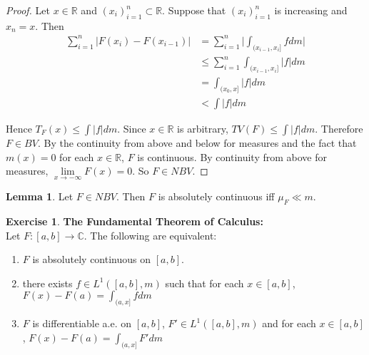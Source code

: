 \documentclass[12pt]{amsart}
\theoremstyle{definition}
\newtheorem{lem}[definition]{Lemma}
\newtheorem{ex}[definition]{Exercise}
\newcommand{\C}{\mathbb{C}}
\newcommand{\R}{\mathbb{R}}
\newcommand{\lex}[1]{\label{ex:#1}}
\begin{document}
	\begin{proof}
		Let $x \in \R$ and $(x_i)_{i=1}^n \subset \R$. Suppose that $(x_i)_{i=1}^n$ is increasing and $x_n=x$. Then 
		\begin{align*}
			\sum_{i=1}^n|F(x_i)-F(x_{i-1})| 
			&= \sum_{i=1}^n \bigg| \int_{(x_{i-1},x_i]}fdm \bigg|\\
			& \leq \sum_{i=1}^n \int_{(x_{i-1},x_i]}|f|dm \\
			& = \int_{(x_0,x]}|f|dm\\
			& < \int|f|dm
		\end{align*}
		
		Hence $T_F(x) \leq \int |f|dm$. Since $x \in \R$ is arbitrary, $TV(F) \leq \int |f|dm$. Therefore $F \in BV$. By the continuity from above and below for measures and the fact that $m({x})=0$ for each $x \in \R$, $F$ is continuous. By continuity from above for measures, $\lim\limits_{x \rightarrow -\infty} F(x) =0$. So $F \in NBV$.
	\end{proof}
	
	\begin{lem}
		Let $F \in NBV$. Then $F$ is absolutely continuous iff $\mu_F \ll m$.
	\end{lem}
	
	\begin{ex} \lex{00000} \textbf{The Fundamental Theorem of Calculus:}\\
		Let $F:[a,b] \rightarrow \C$. The following are equivalent:
		\begin{enumerate}
			\item $F$ is absolutely continuous on $[a,b]$.
			\item there exists $f \in L^1([a,b], m)$ such that for each $x \in [a,b]$, $F(x)-F(a)= \int_{(a,x]}fdm$
			\item $F$ is differentiable a.e. on $[a,b]$, $F' \in L^1([a,b], m)$ and for each $x \in [a,b]$, $F(x)-F(a)=\int_{(a,x]}F'dm$
		\end{enumerate}
	\end{ex}
	
\end{document}
